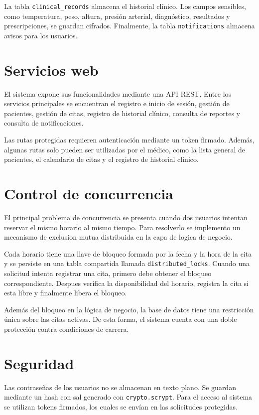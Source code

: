 \documentclass[12pt]{article}
\begin{document}
La tabla \texttt{clinical\_records} almacena el historial clínico. Los campos sensibles, como temperatura, peso, altura, presión arterial, diagnóstico, resultados y prescripciones, se guardan cifrados. Finalmente, la tabla \texttt{notifications} almacena avisos para los usuarios.

\section{Servicios web}

El sistema expone sus funcionalidades mediante una API REST. Entre los servicios principales se encuentran el registro e inicio de sesión, gestión de pacientes, gestión de citas, registro de historial clínico, consulta de reportes y consulta de notificaciones.

Las rutas protegidas requieren autenticación mediante un token firmado. Además, algunas rutas solo pueden ser utilizadas por el médico, como la lista general de pacientes, el calendario de citas y el registro de historial clínico.

\section{Control de concurrencia}

El principal problema de concurrencia se presenta cuando dos usuarios intentan reservar el mismo horario al mismo tiempo. Para resolverlo se implemento un mecanismo de exclusion mutua distribuida en la capa de logica de negocio.

Cada horario tiene una llave de bloqueo formada por la fecha y la hora de la cita y se persiste en una tabla compartida llamada \texttt{distributed\_locks}. Cuando una solicitud intenta registrar una cita, primero debe obtener el bloqueo correspondiente. Despues verifica la disponibilidad del horario, registra la cita si esta libre y finalmente libera el bloqueo.

Además del bloqueo en la lógica de negocio, la base de datos tiene una restricción única sobre las citas activas. De esta forma, el sistema cuenta con una doble protección contra condiciones de carrera.

\section{Seguridad}

Las contraseñas de los usuarios no se almacenan en texto plano. Se guardan mediante un hash con sal generado con \texttt{crypto.scrypt}. Para el acceso al sistema se utilizan tokens firmados, los cuales se envían en las solicitudes protegidas.
\end{document}

